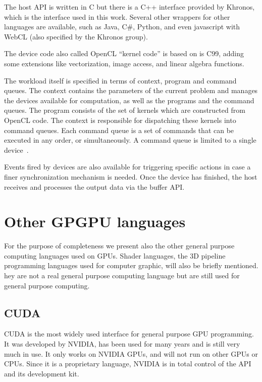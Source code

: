 The host \gls{API} is written in C but there is a C++ interface provided by Khronos, which is the interface used in this work. Several other wrappers for other languages are available, such as Java, C\#, Python, and even javascript with WebCL (also specified by the Khronos group). 

The device code also called \gls{OpenCL} ``kernel code'' is based on is C99, adding some extensions like vectorization, image access, and linear algebra functions.

The workload itself is specified in terms of context, program and command queues. The context contains the parameters of the current problem and manages the devices available for computation, as well as the programs and the command queues. The program consists of the set of kernels which are constructed from \gls{OpenCL} code. The context is responsible for dispatching these kernels into command queues. Each command queue is a set of commands that can be executed in any order, or simultaneously. A command queue is limited to a single device~\cite{OpenCLInAction,OpenCLProgrammingGuide}.

Events fired by devices are also available for triggering specific actions in case a finer synchronization mechanism is needed. Once the device has finished, the host receives and processes the output data via the buffer \gls{API}.

\section{Other GPGPU languages}

For the purpose of completeness we present also the other general purpose computing languages used on \glspl{GPU}. Shader languages, the 3D pipeline programming languages used for computer graphic, will also be briefly mentioned. hey are not a real general purpose computing language but are still used for general purpose computing.

\subsection{CUDA}

\Gls{CUDA} is the most widely used interface for general purpose \gls{GPU} programming. It was developed by NVIDIA, has been used for many years and is still very much in use. It only works on NVIDIA \glspl{GPU}, and will not run on other \glspl{GPU} or \glspl{CPU}. Since it is a proprietary language, NVIDIA is in total control of the API and its development kit.

